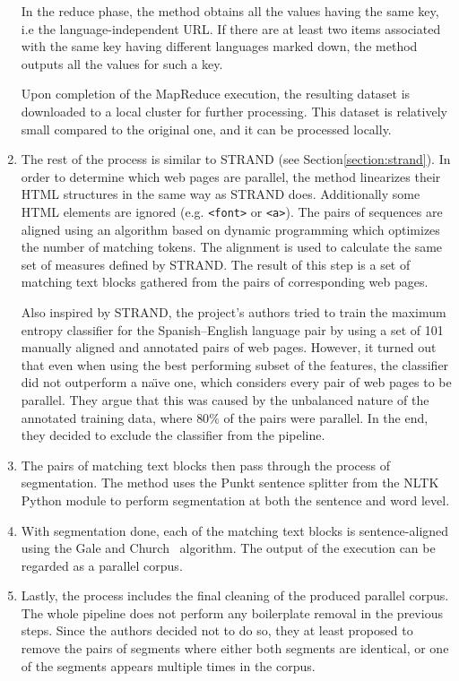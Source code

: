 \begin{enumerate}
	In the reduce phase, the method obtains all the values having the same key, i.e the  language-independent URL. If there are at least two items associated with the same key having different languages marked down, the method outputs all the values for such a key.
	
	Upon completion of the MapReduce execution, the resulting dataset is downloaded to a local cluster for further processing. This dataset is relatively small compared to the original one, and it can be processed locally.
	
	\item The rest of the process is similar to STRAND (see Section\ref{section:strand}). In order to determine which web pages are parallel, the method linearizes their HTML structures in the same way as STRAND does. Additionally some HTML elements are ignored (e.g. \texttt{<font>} or \texttt{<a>}). The pairs of sequences are aligned using an algorithm based on dynamic programming which optimizes the number of matching tokens. The alignment is used to calculate the same set of measures defined by STRAND. The result of this step is a set of matching text blocks gathered from the pairs of corresponding web pages.
	
	Also inspired by STRAND, the project's authors tried to train the maximum entropy classifier for the Spanish--English language pair by using a set of 101 manually aligned and annotated pairs of web pages. However, it turned out that even when using the best performing subset of the features, the classifier did not outperform a na\"{\i}ve one, which considers every pair of web pages to be parallel. They argue that this was caused by the unbalanced nature of the annotated training data, where $80\%$ of the pairs were parallel. In the end, they decided to exclude the classifier from the pipeline.	
	
	\item The pairs of matching text blocks then pass through the process of segmentation. The method uses the Punkt sentence splitter from the NLTK~\cite{Loper02} Python module to perform segmentation at both the sentence and word level.
	
	\item With segmentation done, each of the matching text blocks is sentence-aligned using the Gale and Church~\cite{Gale93} algorithm. The output of the execution can be regarded as a parallel corpus.
	
	\item Lastly, the process includes the final cleaning of the produced parallel corpus. The whole pipeline does not perform any boilerplate removal in the previous steps. Since the authors decided not to do so, they at least proposed to remove the pairs of segments where either both segments are identical, or one of the segments appears multiple times in the corpus.
\end{enumerate}

